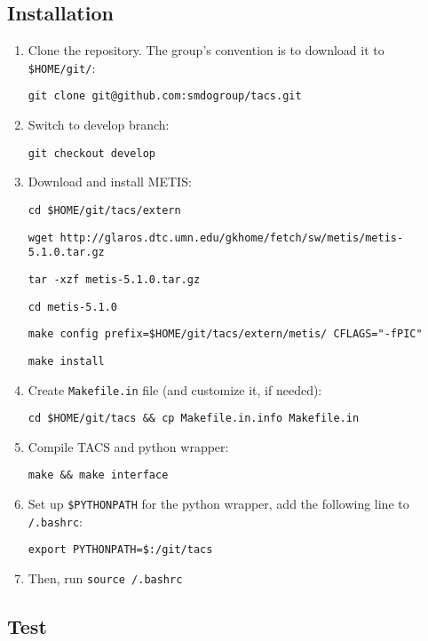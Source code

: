 \documentclass{article}
\begin{document}
\subsection{Installation}

\begin{enumerate}
    \item Clone the repository. The group's convention is to download it to
    \texttt{\$HOME/git/}:

    \texttt{git clone git@github.com:smdogroup/tacs.git}

    \item Switch to develop branch:

    \texttt{git checkout develop}

    \item Download and install METIS:

    \texttt{cd \$HOME/git/tacs/extern}

    \texttt{wget http://glaros.dtc.umn.edu/gkhome/fetch/sw/metis/metis-5.1.0.tar.gz}

    \texttt{tar -xzf metis-5.1.0.tar.gz}

    \texttt{cd metis-5.1.0}

    \texttt{make config prefix=\$HOME/git/tacs/extern/metis/ CFLAGS="-fPIC"}

    \texttt{make install}

    \item Create \texttt{Makefile.in} file (and customize it, if needed):

    \texttt{cd \$HOME/git/tacs \&\& cp Makefile.in.info Makefile.in}

    \item Compile TACS and python wrapper:

    \texttt{make \&\& make interface}

    \item Set up \texttt{\$PYTHONPATH} for the python wrapper, add the following line to \texttt{\texttildelow/.bashrc}:

    \texttt{export PYTHONPATH=\$:\texttildelow/git/tacs}

    \item Then, run \texttt{source \texttildelow/.bashrc}

\end{enumerate}

\subsection{Test}
\end{document}
